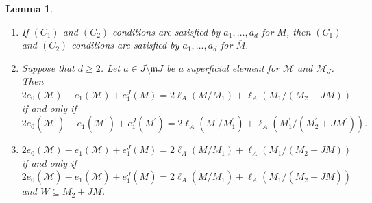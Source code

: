 \documentclass[10pt,a4paper]{amsart}
\newtheorem{lemma}{Lemma}
\def\M{{\mathcal M}}
\newcommand{\m}{\mathfrak m}
\begin{document}
\begin{lemma}\label{lemma-reduction-steps}
	\begin{enumerate}[label=(\roman*)]
		\item  If $(C_1)$ and $(C_2)$ conditions are satisfied by $a_1,\ldots,a_d$ for $M$, then $(C_1)$ and $(C_2)$ conditions are satisfied by $a_1,\ldots,a_d$ for $\overline{M}$. 
		
		\item \label{lemma-4.1} Suppose that $d\geq 2$. Let $a\in J\setminus \m J$ be a superficial element for $\M$ and $\M_J$.  Then  $2e_0(\M)-e_1(\M)+e_1^J(M)=2\ell_A(M/M_1)+\ell_A(M_1/(M_2+JM))$ if and only if
		$2e_0(\M^\prime)-e_1(\M^\prime)+e_1^J(M^\prime)=2\ell_{A}(M^\prime/{M}^\prime_1)+\ell_{A}({M}^\prime_1/({M}^\prime_2+JM^\prime)).$
		
		\item \label{lemma-4.2} $2e_0(\M)-e_1(\M)+e_1^J(M)=2\ell_A(M/M_1)+\ell_A(M_1/(M_2+JM))$ if and only if  
		$2e_0(\overline{\M})-e_1(\overline{\M})+e_1^J(\overline{M})=2\ell_A(\overline{M}/\overline{M_1} )+\ell_A(\overline{M_1} /(\overline{M_2} +J\overline{M}))$ and $W\subseteq M_2+JM$.
	\end{enumerate}
\end{lemma}
\end{document}
